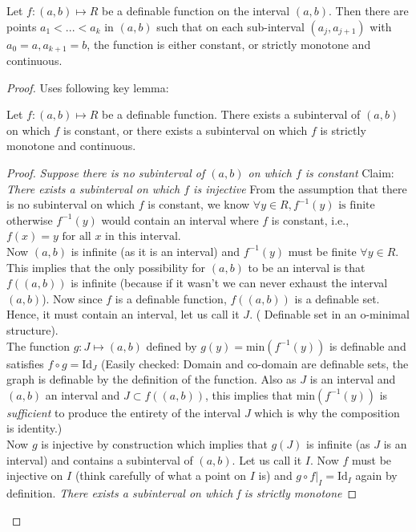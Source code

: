 \begin{theorem}[Monotinicity]
    Let $f:(a,b)\mapsto R$ be a definable function on the interval $(a,b).$ Then there are points $a_1 < ... < a_k$ in $(a,b)$ such that on each sub-interval $(a_j, a_{j+1})$ with $a_0 = a, a_{k+1} = b$, the function is either constant, or strictly monotone and continuous.
\end{theorem}

\begin{proof}
    Uses following key lemma:
    \begin{lemma}
    \label{monotone-lemma}
        Let $f: (a, b)\mapsto R$ be a definable function. There exists a subinterval of $(a,b)$ on which $f$ is constant, or there exists a subinterval on which $f$ is strictly monotone and continuous.
    \end{lemma}
    \begin{proof}
        \textit{Suppose there is no subinterval of $(a, b)$ on which $f$ is constant}
        Claim: \textit{There exists a subinterval on which $f$ is injective}
        From the assumption that there is no subinterval on which $f$ is constant, we know $\forall y\in R, f^{-1}(y) \text{ is finite}$ otherwise $f^{-1}(y)$ would contain an interval where $f$ is constant, i.e., $f(x) = y \text{ for all $x$ in this interval}$.\\ Now $(a, b)$ is infinite (as it is an interval) and $f^{-1}(y)$ must be finite $\forall y \in R$. This implies that the only possibility for $(a,b)$ to be an interval is that $f((a,b))$ is infinite (because if it wasn't we can never exhaust the interval $(a,b)$). Now since $f$ is a definable function, $f((a,b))$ is a definable set. Hence, it must contain an interval, let us call it $J$. ( Definable set in an o-minimal structure).\\ The function $g: J\mapsto(a, b)$ defined by $g(y) = \text{min}(f^{-1}(y))$ is definable and satisfies $f \circ g = \text{Id}_J$ (Easily checked: Domain and co-domain are definable sets, the graph is definable by the definition of the function. Also as $J$ is an interval and $(a, b)$ an interval and $J\subset f((a,b))$, this implies that $\text{min}(f^{-1}(y))$ is \textit{ sufficient} to produce the entirety of the interval $J$ which is why the composition is identity.)\\ Now $g$ is injective by construction which implies that $g(J)$ is infinite (as $J$ is an interval) and contains a subinterval of $(a,b)$. Let us call it $I$. Now $f$ must be injective on $I$ (think carefully of what a point on $I$ is) and $g \circ f|_I = \text{Id}_I$ again by definition.
        \textit{There exists a subinterval on which f is strictly monotone}
        

\end{proof}
\end{proof}
